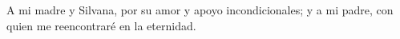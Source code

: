 A mi madre y Silvana, por su amor y apoyo incondicionales; y a mi padre, con quien me reencontraré en la eternidad.